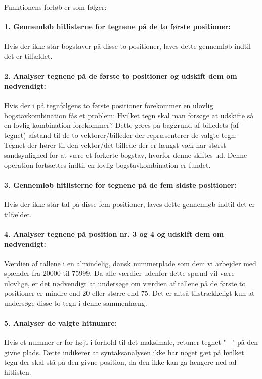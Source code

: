 Funktionens forløb er som følger:

\paragraph{1. Gennemløb hitlisterne for tegnene på de to første positioner:} Hvis der ikke står bogstaver på disse to positioner, laves dette gennemløb indtil det er tilfældet.
\paragraph{2. Analyser tegnene på de første to positioner og udskift dem om nødvendigt:}
Hvis der i på tegnfølgens to første positioner forekommer en ulovlig bogstavkombination fås et problem: Hvilket tegn skal man forsøge at udskifte så en lovlig kombination forekommer? Dette gøres på baggrund af billedets (af tegnet) afstand til de to vektorer/billeder der repræsenterer de valgte tegn: Tegnet der hører til den vektor/det billede der er længst væk har størst sandsynlighed for at være et forkerte bogstav, hvorfor denne skiftes ud. Denne operation fortsættes indtil en lovlig bogstavkombination er fundet.

\paragraph{3. Gennemløb hitlisterne for tegnene på de fem sidste positioner:} Hvis der ikke står tal på disse fem positioner, laves dette gennemløb indtil det er tilfældet.

\paragraph{4. Analyser tegnene på position nr. 3 og 4 og udskift dem om nødvendigt:}
Værdien af tallene i en almindelig, dansk nummerplade som dem vi arbejder med spænder fra 20000 til 75999. Da alle værdier udenfor dette spænd vil være ulovlige, er det nødvendigt at undersøge om værdien af tallene på de første to positioner er mindre end 20 eller større end 75. Det er altså tilstrækkeligt kun at undersøge disse to tegn i denne sammenhæng.

\paragraph{5. Analyser de valgte hitnumre:} Hvis et nummer er for højt i forhold til det maksimale, retuner tegnet "\textbf{\_}" på den givne plads. Dette indikerer at syntaksanalysen ikke har noget gæt på hvilket tegn der skal stå på den givne position, da den ikke kan gå længere ned ad hitlisten.

